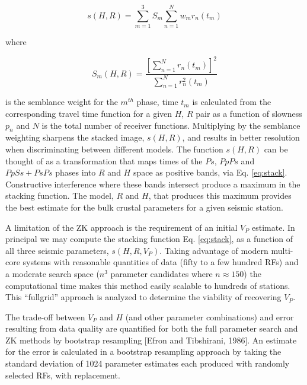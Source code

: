 \documentclass[draft, 12pt]{article}
\begin{document}
\begin{equation}  \label{eq:stack}
s(H,R) = \sum_{m=1}^{3} S_m \sum_{n=1}^N w_mr_n(t_m)
\end{equation}

\noindent where

\begin{equation}
S_m(H,R) = \frac {\left[ \sum_{n=1}^N r_n(t_m) \right]^2}
                 { \sum_{n=1}^N r_n^2(t_m) }
\end{equation}

\noindent is the semblance weight for the $m^{th}$ phase, time $t_m$ is calculated from the corresponding travel time function for a given $H$, $R$ pair as a function of slowness $p_n$ and $N$ is the total number of receiver functions. Multiplying by the semblance weighting sharpens the stacked image, $s(H,R)$, and results in better resolution when discriminating between different models. The function $s(H,R)$ can be thought of as a transformation that maps times of the $Ps$, $PpPs$ and $PpSs+PsPs$ phases into $R$ and $H$ space as positive bands, via Eq. \ref{eq:stack}. Constructive interference where these bands intersect produce a maximum in the stacking function. The model, $R$ and $H$, that produces this maximum provides the best estimate for the bulk crustal parameters for a given seismic station.

A limitation of the ZK approach is the requirement of an initial $V_P$ estimate. In principal we may compute the stacking function Eq. \ref{eq:stack}, as a function of all three seismic parameters, $s(H,R,V_P)$. Taking advantage of modern multi-core systems with reasonable quantities of data (fifty to a few hundred RFs) and a moderate search space ($n^3$ parameter candidates where $n \approx 150$) the computational time makes this method easily scalable to hundreds of stations. This ``fullgrid'' approach is analyzed to determine the viability of recovering $V_P$.

The trade-off between $V_P$ and $H$ (and other parameter combinations) and error resulting from data quality are quantified for both the full parameter search and ZK methods by bootstrap resampling [Efron and Tibshirani, 1986]. An estimate for the error is calculated in a bootstrap resampling approach by taking the standard deviation of 1024 parameter estimates each produced with randomly selected RFs, with replacement.
\end{document}
